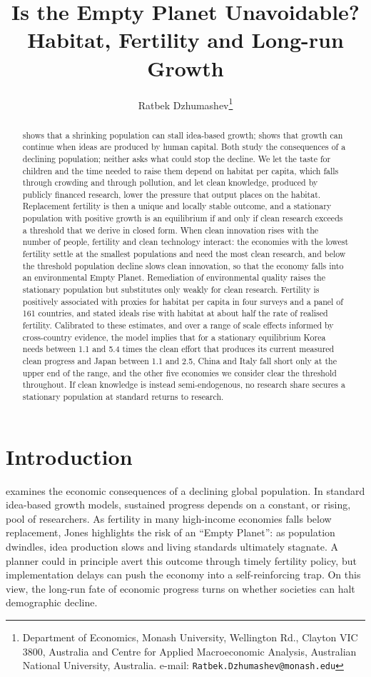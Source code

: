 \documentclass[11pt]{article}
\title{Is the Empty Planet Unavoidable? \\
Habitat, Fertility and Long-run Growth}%
\author{Ratbek Dzhumashev\thanks{Department of Economics, Monash University, Wellington Rd., Clayton VIC 3800, Australia and Centre for Applied Macroeconomic Analysis, Australian National University, Australia.           e-mail: \texttt{Ratbek.Dzhumashev@monash.edu}} 	
}
\date{}
\begin{document}
\maketitle
\begin{abstract}
\noindent
\citet{jones22} shows that a shrinking population can stall idea-based growth; \citet{STRULIK2024104943}
shows that growth can continue when ideas are produced by human capital. Both study the consequences of
a declining population; neither asks what could stop the decline. We let the taste for children and the time needed to raise them depend
on habitat per capita, which falls through crowding and through pollution, and let clean knowledge,
produced by publicly financed research, lower the pressure that output places on the habitat.
Replacement fertility is then a unique and locally stable outcome, and a stationary population with
positive growth is an equilibrium if and only if clean research exceeds a threshold that we derive in
closed form. When clean innovation rises with the number of people, fertility and clean technology
interact: the economies with the lowest fertility settle at the smallest populations and need the most
clean research, and below the threshold population decline slows clean innovation, so that the economy
falls into an environmental Empty Planet. Remediation of environmental quality raises the stationary population but substitutes only weakly
for clean research. Fertility is positively associated with proxies for habitat per capita in four
surveys and a panel of 161 countries, and stated ideals rise with habitat at about half the rate of
realised fertility. Calibrated to these estimates, and over a range of scale effects informed by
cross-country evidence, the model implies that for a stationary equilibrium Korea needs between 1.1 and
5.4 times the clean effort that produces its current measured clean progress and Japan between 1.1 and
2.5, China and Italy fall short only at the upper end of the range, and the other five economies we
consider clear the threshold throughout. If clean knowledge is instead semi-endogenous, no research share
secures a stationary population at standard returns to research.
\end{abstract}
\onehalfspacing
\section{Introduction}
\citet{jones22} examines the economic consequences of a declining global population. In standard
idea-based growth models, sustained progress depends on a constant, or rising, pool of researchers.
As fertility in many high-income economies falls below replacement, Jones highlights the risk of an
``Empty Planet'': as population dwindles, idea production slows and living standards ultimately
stagnate. A planner could in principle avert this outcome through timely fertility policy, but
implementation delays can push the economy into a self-reinforcing trap. On this view, the long-run
fate of economic progress turns on whether societies can halt demographic decline.
\end{document}
